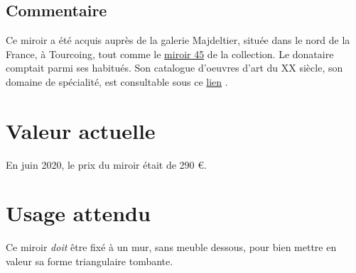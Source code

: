     \subsection* {Commentaire}
     Ce miroir a été acquis auprès de la galerie Majdeltier, située dans le nord de la
                France, à Tourcoing, tout comme le 
    \href{miroir45.xml}{miroir
                    45}
   de la collection. Le donataire comptait parmi ses habitués. Son
                catalogue d’oeuvres d’art du XX
    {}
   siècle, son domaine de spécialité, est consultable
                sous ce 
    \href{https://www.proantic.com/galerie/majdeltier/}{lien}
  . 
    \section* {Valeur actuelle}
    En juin 2020, le prix du miroir était de 290 €.
    \section* {Usage attendu}
     Ce miroir 
    {\em {doit}}
   être fixé à un mur, sans meuble dessous, pour bien mettre en valeur
            sa forme triangulaire tombante.   
  